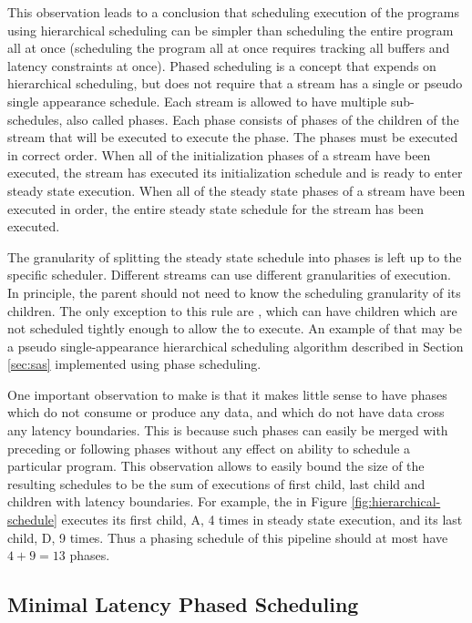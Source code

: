 This observation leads to a conclusion that scheduling execution
of the {\StreamIt} programs using hierarchical scheduling can be
simpler than scheduling the entire program all at once (scheduling
the program all at once requires tracking all buffers and latency
constraints at once).  Phased scheduling is a concept that expends
on hierarchical scheduling, but does not require that a stream has
a single or pseudo single appearance schedule.  Each stream is
allowed to have multiple sub-schedules, also called phases. Each
phase consists of phases of the children of the stream that will
be executed to execute the phase. The phases must be executed in
correct order. When all of the initialization phases of a stream
have been executed, the stream has executed its initialization
schedule and is ready to enter steady state execution. When all of
the steady state phases of a stream have been executed in order,
the entire steady state schedule for the stream has been executed.

The granularity of splitting the steady state schedule into phases
is left up to the specific scheduler.  Different streams can use
different granularities of execution.  In principle, the parent
should not need to know the scheduling granularity of its
children. The only exception to this rule are {\feedbackloops},
which can have children which are not scheduled tightly enough to
allow the {\feedbackloop} to execute. An example of that may be a
pseudo single-appearance hierarchical scheduling algorithm
described in Section \ref{sec:sas} implemented using phase
scheduling.

One important observation to make is that it makes little sense to
have phases which do not consume or produce any data, and which do
not have data cross any latency boundaries.  This is because such
phases can easily be merged with preceding or following phases
without any effect on ability to schedule a particular program.
This observation allows to easily bound the size of the resulting
schedules to be the sum of executions of first child, last child
and children with latency boundaries. For example, the {\pipeline}
in Figure \ref{fig:hierarchical-schedule} executes its first
child, {\filter} A, 4 times in steady state execution, and its last
child, {\filter} D, 9 times. Thus a phasing schedule of this
pipeline should at most have $4+9=13$ phases.

\subsection{Minimal Latency Phased Scheduling}
\label{sec:min-latency}

